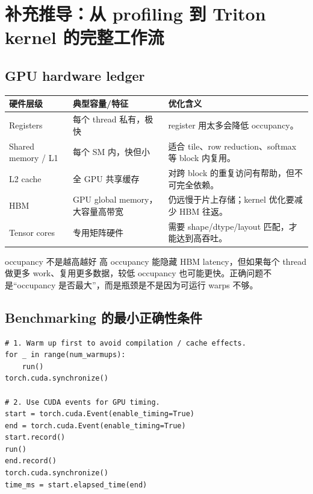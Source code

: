 \section{补充推导：从 profiling 到 Triton kernel 的完整工作流}

\subsection{GPU hardware ledger}

\begin{longtable}{p{}p{}p{}}
\toprule
\textbf{硬件层级} & \textbf{典型容量/特征} & \textbf{优化含义} \\
\midrule
Registers & 每个 thread 私有，极快 & register 用太多会降低 occupancy。 \\
Shared memory / L1 & 每个 SM 内，快但小 & 适合 tile、row reduction、softmax 等 block 内复用。 \\
L2 cache & 全 GPU 共享缓存 & 对跨 block 的重复访问有帮助，但不可完全依赖。 \\
HBM & GPU global memory，大容量高带宽 & 仍远慢于片上存储；kernel 优化要减少 HBM 往返。 \\
Tensor cores & 专用矩阵硬件 & 需要 shape/dtype/layout 匹配，才能达到高吞吐。 \\
\bottomrule
\end{longtable}

\begin{warningbox}{occupancy 不是越高越好}
高 occupancy 能隐藏 HBM latency，但如果每个 thread 做更多 work、复用更多数据，较低 occupancy 也可能更快。正确问题不是“occupancy 是否最大”，而是瓶颈是不是因为可运行 warps 不够。
\end{warningbox}

\subsection{Benchmarking 的最小正确性条件}

\begin{lstlisting}[caption={Benchmarking checklist}]
# 1. Warm up first to avoid compilation / cache effects.
for _ in range(num_warmups):
    run()
torch.cuda.synchronize()

# 2. Use CUDA events for GPU timing.
start = torch.cuda.Event(enable_timing=True)
end = torch.cuda.Event(enable_timing=True)
start.record()
run()
end.record()
torch.cuda.synchronize()
time_ms = start.elapsed_time(end)
\end{lstlisting}

